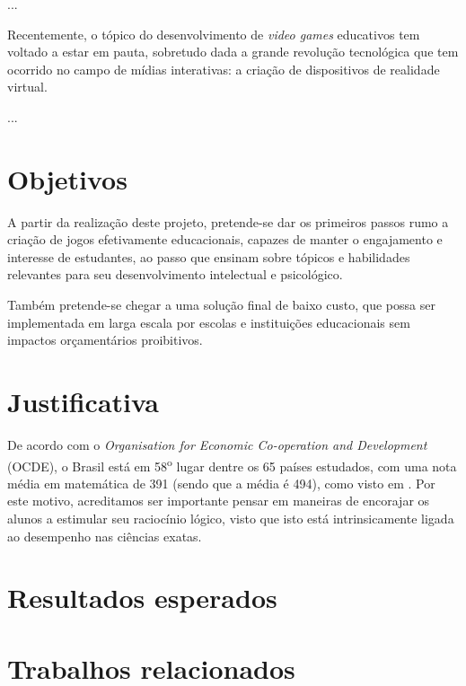...

Recentemente, o tópico do desenvolvimento de \textit{video games} educativos tem voltado a estar em pauta, sobretudo dada a grande revolução tecnológica que tem ocorrido no campo de mídias interativas: a criação de dispositivos de realidade virtual.

...


\section{Objetivos}\label{sec-objetivos}

A partir da realização deste projeto, pretende-se dar os primeiros passos rumo a criação de jogos efetivamente educacionais, capazes de manter o engajamento e interesse de estudantes, ao passo que ensinam sobre tópicos e habilidades relevantes para seu desenvolvimento intelectual e psicológico.

Também pretende-se chegar a uma solução final de baixo custo, que possa ser implementada em larga escala por escolas e instituições educacionais sem impactos orçamentários proibitivos.



\section{Justificativa}\label{sec-justificativas}

De acordo com o \textit{Organisation for Economic Co-operation and Development} (OCDE), o Brasil está em 58\textsuperscript{o} lugar dentre os 65 países estudados, com uma nota média em matemática de 391 (sendo que a média é 494), como visto em \cite{OECD:2016:low_performing_students}. Por este motivo, acreditamos ser importante pensar em maneiras de encorajar os alunos a estimular seu raciocínio lógico, visto que isto está intrinsicamente ligada ao desempenho nas ciências exatas.


\section{Resultados esperados}\label{sec-resultados-esperados}


\section{Trabalhos relacionados}\label{sec-trabalhos-relacionados}

